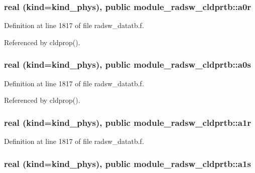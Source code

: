 \subsubsection[{\texorpdfstring{a0r}{a0r}}]{\setlength{\rightskip}{0pt plus 5cm}real (kind=kind\+\_\+phys), public module\+\_\+radsw\+\_\+cldprtb\+::a0r}\hypertarget{group__module__radsw__main_ga0fdb9425031a10735e11d7f5c9e0376e}{}\label{group__module__radsw__main_ga0fdb9425031a10735e11d7f5c9e0376e}


Definition at line 1817 of file radsw\+\_\+datatb.\+f.



Referenced by cldprop().

\subsubsection[{\texorpdfstring{a0s}{a0s}}]{\setlength{\rightskip}{0pt plus 5cm}real (kind=kind\+\_\+phys), public module\+\_\+radsw\+\_\+cldprtb\+::a0s}\hypertarget{group__module__radsw__main_ga81ba576e28e5844772d040ff7543faae}{}\label{group__module__radsw__main_ga81ba576e28e5844772d040ff7543faae}


Definition at line 1817 of file radsw\+\_\+datatb.\+f.



Referenced by cldprop().

\subsubsection[{\texorpdfstring{a1r}{a1r}}]{\setlength{\rightskip}{0pt plus 5cm}real (kind=kind\+\_\+phys), public module\+\_\+radsw\+\_\+cldprtb\+::a1r}\hypertarget{group__module__radsw__main_ga9826a0616c434620200ce4652b5af800}{}\label{group__module__radsw__main_ga9826a0616c434620200ce4652b5af800}


Definition at line 1817 of file radsw\+\_\+datatb.\+f.

\subsubsection[{\texorpdfstring{a1s}{a1s}}]{\setlength{\rightskip}{0pt plus 5cm}real (kind=kind\+\_\+phys), public module\+\_\+radsw\+\_\+cldprtb\+::a1s}\hypertarget{group__module__radsw__main_ga9bf8de06b96c5014ca7f21fd39d84257}{}\label{group__module__radsw__main_ga9bf8de06b96c5014ca7f21fd39d84257}


